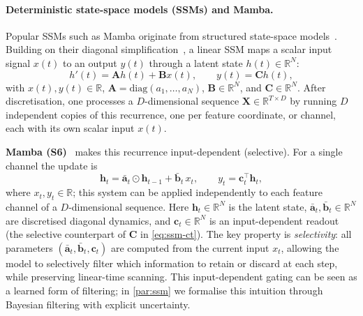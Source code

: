 \documentclass{article}
\begin{document}
\paragraph{Deterministic state-space models (SSMs) and Mamba.}
Popular SSMs such as Mamba originate from structured
state-space models~\citep{gu2021efficiently}.
Building on their diagonal simplification~\citep{gupta2022simplifying},
a linear SSM maps a scalar input signal $x(t)$ to an output $y(t)$
through a latent state $h(t)\in\mathbb{R}^{N}$:
\begin{equation}
h'(t)=\mathbf{A}h(t)+\mathbf{B}x(t),\qquad
y(t)=\mathbf{C}h(t),
\label{eq:ssm-ct}
\end{equation}
with $x(t),y(t)\!\in\!\mathbb{R}$,
$\mathbf{A}=\mathrm{diag}(a_1,\dots,a_N)$, $\mathbf{B}\in\mathbb{R}^{N}$,
and $\mathbf{C}\in\mathbb{R}^{N}$.
After discretisation, one processes a
$D$-dimensional sequence $\mathbf{X}\in\mathbb{R}^{T\times D}$ by running $D$
independent copies of this recurrence, one per feature coordinate, or
channel, each with its own scalar input $x(t)$.


\textbf{Mamba (S6)}~\cite{gu2023mamba} makes this recurrence
input-dependent (selective).
For a single channel the update is
\begin{equation}
\mathbf{h}_t
  =\bar{\mathbf{a}}_t\odot\mathbf{h}_{t-1}
  +\bar{\mathbf{b}}_t\, x_t,
\qquad
y_t=\mathbf{c}_t^{\top}\mathbf{h}_t,
\label{eq:mamba-rec}
\end{equation}
where $x_t,y_t\!\in\!\mathbb{R}$; this system can be applied
independently to each feature channel of a $D$-dimensional sequence.
Here $\mathbf{h}_t\!\in\!\mathbb{R}^{N}$ is the latent state,
$\bar{\mathbf{a}}_t,\bar{\mathbf{b}}_t\!\in\!\mathbb{R}^{N}$ are discretised
diagonal dynamics, and
$\mathbf{c}_t\!\in\!\mathbb{R}^{N}$ is an input-dependent readout
(the selective counterpart of
$\mathbf{C}$ in \cref{eq:ssm-ct}).
The key property is \emph{selectivity}: all parameters
$(\bar{\mathbf{a}}_t,\bar{\mathbf{b}}_t,\mathbf{c}_t)$ are computed from the
current input $x_t$, allowing the model to selectively filter which
information to retain or discard at each step, while preserving
linear-time scanning.
This input-dependent gating can be seen as a learned form of
filtering; in \cref{par:ssm} we formalise this intuition through
Bayesian filtering with explicit uncertainty.
\end{document}
